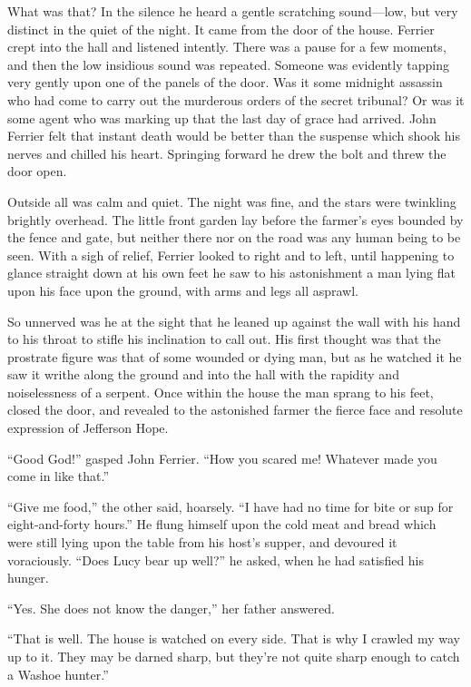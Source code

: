 \documentclass[12pt]{book}
\begin{document}
What was that? In the silence he heard a gentle scratching sound—low, but very distinct in the quiet of the night. It came from the door of the house. Ferrier crept into the hall and listened intently. There was a pause for a few moments, and then the low insidious sound was repeated. Someone was evidently tapping very gently upon one of the panels of the door. Was it some midnight assassin who had come to carry out the murderous orders of the secret tribunal? Or was it some agent who was marking up that the last day of grace had arrived. John Ferrier felt that instant death would be better than the suspense which shook his nerves and chilled his heart. Springing forward he drew the bolt and threw the door open. 

Outside all was calm and quiet. The night was fine, and the stars were twinkling brightly overhead. The little front garden lay before the farmer’s eyes bounded by the fence and gate, but neither there nor on the road was any human being to be seen. With a sigh of relief, Ferrier looked to right and to left, until happening to glance straight down at his own feet he saw to his astonishment a man lying flat upon his face upon the ground, with arms and legs all asprawl. 

So unnerved was he at the sight that he leaned up against the wall with his hand to his throat to stifle his inclination to call out. His first thought was that the prostrate figure was that of some wounded or dying man, but as he watched it he saw it writhe along the ground and into the hall with the rapidity and noiselessness of a serpent. Once within the house the man sprang to his feet, closed the door, and revealed to the astonished farmer the fierce face and resolute expression of Jefferson Hope. 

“Good God!” gasped John Ferrier. “How you scared me! Whatever made you come in like that.” 

“Give me food,” the other said, hoarsely. “I have had no time for bite or sup for eight-and-forty hours.” He flung himself upon the cold meat and bread which were still lying upon the table from his host’s supper, and devoured it voraciously. “Does Lucy bear up well?” he asked, when he had satisfied his hunger. 

“Yes. She does not know the danger,” her father answered. 

“That is well. The house is watched on every side. That is why I crawled my way up to it. They may be darned sharp, but they’re not quite sharp enough to catch a Washoe hunter.” 
\end{document}
